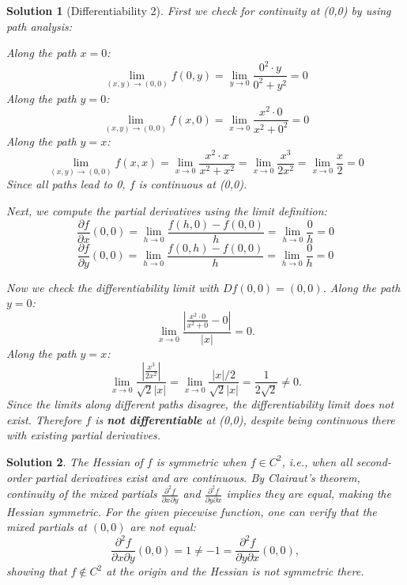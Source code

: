 \documentclass{article}
\newtheorem{solution}{Solution}
\begin{document}
\begin{solution}[Differentiability 2]
    First we check for continuity at (0,0) by using path analysis:

    \noindent Along the path \(x = 0\):
    \[\lim_{(x,y) \to (0,0)} f(0,y) = \lim_{y \to 0} \frac{0^2 \cdot y}{0^2 + y^2} = 0\]
    \noindent Along the path \(y = 0\):
    \[\lim_{(x,y) \to (0,0)} f(x,0) = \lim_{x \to 0} \frac{x^2 \cdot 0}{x^2 + 0^2} = 0\]
    \noindent Along the path \(y = x\):
    \[\lim_{(x,y) \to (0,0)} f(x,x) = \lim_{x \to 0} \frac{x^2 \cdot x}{x^2 + x^2} = \lim_{x \to 0} \frac{x^3}{2x^2} = \lim_{x \to 0} \frac{x}{2} = 0\]
    Since all paths lead to 0, \(f\) is continuous at (0,0).

    Next, we compute the partial derivatives using the limit definition:
    \[\frac{\partial f}{\partial x}(0,0) = \lim_{h \to 0} \frac{f(h, 0) - f(0,0)}{h} = \lim_{h \to 0} \frac{0}{h} = 0\]
    \[\frac{\partial f}{\partial y}(0,0) = \lim_{h \to 0} \frac{f(0, h) - f(0,0)}{h} = \lim_{h \to 0} \frac{0}{h} = 0\]

    Now we check the differentiability limit with \(Df(0,0) = (0,0)\). Along the path \(y = 0\):
    \[\lim_{x \to 0} \frac{\left|\frac{x^2 \cdot 0}{x^2 + 0} - 0\right|}{|x|} = 0.\]
    Along the path \(y = x\):
    \[\lim_{x \to 0} \frac{\left|\frac{x^3}{2x^2}\right|}{\sqrt{2}|x|} = \lim_{x \to 0} \frac{|x|/2}{\sqrt{2}|x|} = \frac{1}{2\sqrt{2}} \neq 0.\]
    Since the limits along different paths disagree, the differentiability limit does not exist. Therefore \(f\) is \textbf{not differentiable} at (0,0), despite being continuous there with existing partial derivatives.
\end{solution}

\begin{solution}
The Hessian of \(f\) is symmetric when \(f \in C^2\), i.e., when all second-order partial derivatives exist and are continuous. By Clairaut's theorem, continuity of the mixed partials \(\frac{\partial^2 f}{\partial x \partial y}\) and \(\frac{\partial^2 f}{\partial y \partial x}\) implies they are equal, making the Hessian symmetric. For the given piecewise function, one can verify that the mixed partials at $(0,0)$ are not equal:
\[\frac{\partial^2 f}{\partial x \partial y}(0,0) = 1 \neq -1 = \frac{\partial^2 f}{\partial y \partial x}(0,0),\]
showing that \(f \notin C^2\) at the origin and the Hessian is not symmetric there.
\end{solution}
\end{document}
